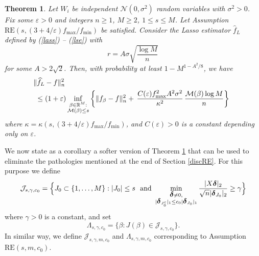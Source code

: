 \documentclass[dvips,aos]{imsart}
\numberwithin{equation}{section}
\theoremstyle{plain}
\newtheorem{thm}{Theorem}[section]%
\def\sf{}
\def\wideth{\widehat}
\def\scm{{\cal M}}
\def\eps{\varepsilon}
\def\RR{\mathbb R}
\def\RE#1#2{$\text{RE}(#1,#2)$}
\def\REm#1#2#3{$\text{RE}(#1,#2,#3)$}
\newcommand{\bD}{\mbox{\boldmath$\delta$}}
\begin{document}
\begin{thm}\label{th-ora-las}
Let  $W_i$ be independent ${\mathcal N}(0,\sigma^2)$ random
variables with $\sigma^2>0$. Fix some $\eps>0$ and integers $n\ge1$,
$M\ge2$, $1\le s\le M$. Let Assumption \RE
s{(3+4/\eps)f_{\max}/f_{\min}} be satisfied. Consider the Lasso
estimator $\wideth{f}_L$ defined by (\ref{lass}) -- (\ref{lse}) with
$$
r= A\sigma \sqrt{\frac{\log M}{n}}\,
$$
for some $A>2\sqrt{2}$. Then, with probability at least
$1-M^{1-A^2/8}$, we have
\begin{equation}\label{predlasso}
\begin{split}
&\hspace{-0.3em} \| \wideth f_L -f\|_n^2
\\
&\le  (1+\eps) \inf_{\substack{\beta\in\RR^M:\\\scm(\beta)\le
s}}\left\{\| {\sf f}_\beta -f \|_n^2 + \,\frac{C(\eps)f_{\max}^2A^2
\sigma^2}{\kappa^2}\, \frac{\scm(\beta)\log M}{n}\right\}\,
\end{split}\end{equation}
where $\kappa=\kappa(s,(3+4/\eps)f_{\max}/f_{\min})$, and
$C(\eps)>0$ is a constant depending only on $\eps$.
\end{thm}




We now state as a corollary a softer version of Theorem
\ref{th-ora-las} that can be used to eliminate the pathologies
mentioned at the end of Section \ref{discRE}. For this purpose we
define
$${\mathcal J}_{s,\gamma,c_0} = \Big\{J_0 \subset\{1,\dots,M\}: |J_0|\leq
s \ \ \text{and} \ %
\min_{\substack{\bD\neq 0, \\ |\bD_{J_0^c}|_1\le c_0|\bD_{J_0}|_1}}
\frac{|X\bD|_2}{\sqrt{n}|\bD_{J_0}|_2}\ge \gamma\Big\}$$ where
$\gamma>0$ is a constant, and set
$$
\Lambda_{s,\gamma,c_0}= \{\beta:
J(\beta)\in {\mathcal J} _{s,\gamma,c_0}\}.
$$
In similar way, we define ${\mathcal J}_{s,\gamma,m, c_0}$ and
$\Lambda_{s,\gamma,m,c_0}$ corresponding to Assumption
\REm sm{c_0}.
\end{document}
